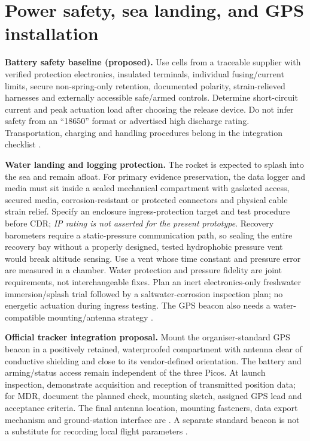 \section{Power safety, sea landing, and GPS installation}
\label{sec:splash}
\textbf{Battery safety baseline (proposed).} Use cells from a traceable supplier with verified protection electronics, insulated terminals, individual fusing/current limits, secure non-spring-only retention, documented polarity, strain-relieved harnesses and externally accessible safe/armed controls. Determine short-circuit current and peak actuation load after choosing the release device. Do not infer safety from an ``18650'' format or advertised high discharge rating. Transportation, charging and handling procedures belong in the integration checklist \cite{rtc2027app03}.

\textbf{Water landing and logging protection.} The rocket is expected to splash into the sea and remain afloat. For primary evidence preservation, the data logger and media must sit inside a sealed mechanical compartment with gasketed access, secured media, corrosion-resistant or protected connectors and physical cable strain relief. Specify an enclosure ingress-protection target and test procedure before CDR; \emph{IP rating is not asserted for the present prototype}. Recovery barometers require a static-pressure communication path, so sealing the entire recovery bay without a properly designed, tested hydrophobic pressure vent would break altitude sensing. Use a vent whose time constant and pressure error are measured in a chamber. Water protection and pressure fidelity are joint requirements, not interchangeable fixes. Plan an inert electronics-only freshwater immersion/splash trial followed by a saltwater-corrosion inspection plan; no energetic actuation during ingress testing. The GPS beacon also needs a water-compatible mounting/antenna strategy \cite{rtc2027app03,rtc2027app08}.

\textbf{Official tracker integration proposal.} Mount the organiser-standard GPS beacon in a positively retained, waterproofed compartment with antenna clear of conductive shielding and close to its vendor-defined orientation. The battery and arming/status access remain independent of the three Picos. At launch inspection, demonstrate acquisition and reception of transmitted position data; for MDR, document the planned check, mounting sketch, assigned GPS lead and acceptance criteria. The final antenna location, mounting fasteners, data export mechanism and ground-station interface are . A separate standard beacon is not a substitute for recording local flight parameters \cite{rtc2027app03}.

